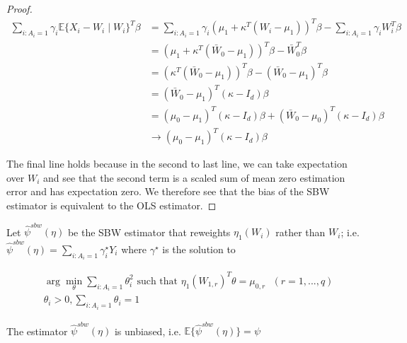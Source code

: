 \begin{proof}
\begin{align*}
    \sum_{i: A_i = 1} \gamma_i\mathbb{E}\{X_i - W_i \mid W_i\}^T\beta &= \sum_{i: A_i = 1} \gamma_i (\mu_1 + \kappa^T(W_i - \mu_1))^T\beta - \sum_{i: A_i = 1}\gamma_i W_i^T\beta \\
    &= (\mu_1 + \kappa^T(\bar{W}_0 - \mu_1))^T\beta - \bar{W}_0^T\beta \\
    &= (\kappa^T(\bar{W}_0 - \mu_1))^T\beta - (\bar{W}_0 - \mu_1)^T\beta  \\
    &= (\bar{W}_0 - \mu_1)^T(\kappa - I_d)\beta \\
    &= (\mu_0 - \mu_1)^T(\kappa - I_d)\beta + (\bar{W}_0 - \mu_0)^T(\kappa - I_d)\beta \\
    &\to (\mu_0 - \mu_1)^T(\kappa - I_d)\beta
\end{align*}

The final line holds because in the second to last line, we can take expectation over $W_i$ and see that the second term is a scaled sum of mean zero estimation error and has expectation zero. We therefore see that the  bias of the SBW estimator is equivalent to the OLS estimator.
\end{proof}

Let $\hat{\psi}^{sbw}(\eta)$ be the SBW estimator that reweights $\eta_1(W_i)$ rather than $W_i$; i.e. $\hat{\psi}^{sbw}(\eta) = \sum_{i: A_i = 1}\gamma_i^\star Y_i$ where $\gamma^\star$ is the solution to

\begin{align*}
&\arg\min_{\theta} \sum_{i: A_i = 1}\theta_i^2 \text{ such that } \eta_1(W_{1, r})^T\theta = \mu_{0, r} \ \ \ (r = 1, ..., q) \\
&\theta_i > 0, \sum_{i: A_i = 1} \theta_i = 1
\end{align*}

\begin{proposition}
The estimator $\hat{\psi}^{sbw}(\eta)$ is unbiased, i.e.
$\mathbb{E}\{\hat{\psi}^{sbw}(\eta)\} = \psi$
\end{proposition}

